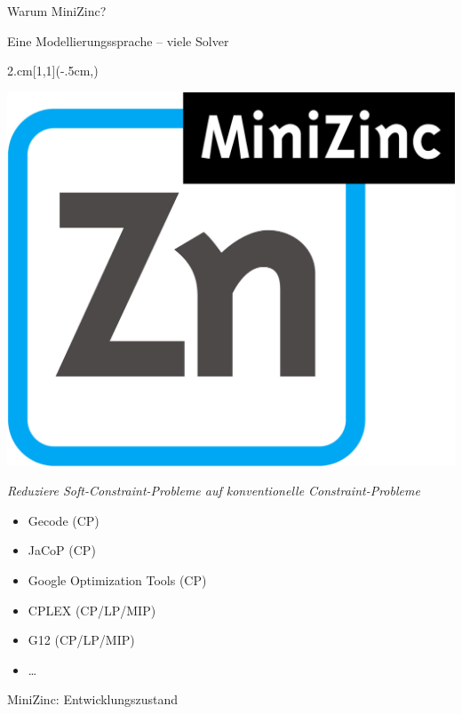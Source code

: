 \begin{frame}{Warum MiniZinc?}
\begin{parchment}[Rationale]
\centering 
\alert{Eine Modellierungssprache -- viele Solver} 
\end{parchment}

\begin{textblock*}{2.cm}[1,1](\textwidth-.5cm,\textheight-1.03cm)

\includegraphics[width=\textwidth]{img/MiniZn_logo.jpg} 

\end{textblock*}
\emph{Reduziere Soft-Constraint-Probleme auf konventionelle Constraint-Probleme}

\begin{itemize}
\item Gecode (CP)
\item JaCoP (CP)
\item Google Optimization Tools (CP)
\item CPLEX (CP/LP/MIP)
\item G12 (CP/LP/MIP)
\item \ldots
\end{itemize}
\end{frame}

\begin{frame}{MiniZinc: Entwicklungszustand}

\end{frame}